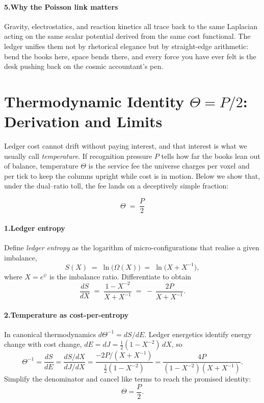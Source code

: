 \documentclass[11pt,oneside]{book}
\begin{document}
\paragraph*{5.\;Why the Poisson link matters}

Gravity, electrostatics, and reaction kinetics all trace back to the
same Laplacian acting on the same scalar potential derived from the same
cost functional.  
The ledger unifies them not by rhetorical elegance but by
straight-edge arithmetic: bend the books here, space bends there, and
every force you have ever felt is the desk pushing back on the cosmic
accountant’s pen.

\section{Thermodynamic Identity \texorpdfstring{$\Theta = P/2$}{Θ = P⁄2}: Derivation and Limits}
\label{sec:theta-p-half}

Ledger cost cannot drift without paying interest, and that interest is what we usually call \emph{temperature}.  
If recognition pressure $P$ tells how far the books lean out of balance, temperature $\Theta$ is the service fee the universe charges per voxel and per tick to keep the columns upright while cost is in motion.  
Below we show that, under the dual–ratio toll, the fee lands on a deceptively simple fraction:

\[
  \boxed{\;\Theta \;=\; \frac{P}{2}\;}
\]

\paragraph*{1.\;Ledger entropy}

Define \emph{ledger entropy} as the logarithm of micro-configurations that realise a given imbalance,
\[
  S(X) \;=\; \ln\!\bigl(\Omega(X)\bigr)
           \;=\; \ln\!\bigl(X + X^{-1}\bigr),
\]
where $X=e^{\psi}$ is the imbalance ratio.  
Differentiate to obtain
\[
  \frac{dS}{dX}
  \;=\;
  \frac{1 - X^{-2}}{X + X^{-1}}
  \;=\;
  -\,\frac{2P}{X + X^{-1}}.
\]

\paragraph*{2.\;Temperature as cost-per-entropy}

In canonical thermodynamics
\(d\Theta^{-1} = dS/dE\).  
Ledger energetics identify energy change with cost change,
$dE = dJ = \tfrac12(1 - X^{-2})\,dX$,  
so
\[
  \Theta^{-1}
  =
  \frac{dS}{dE}
  =
  \frac{dS/dX}{dJ/dX}
  =
  \frac{-2P/(X + X^{-1})}{\tfrac12(1 - X^{-2})}
  =
  \frac{4P}{(1 - X^{-2})(X + X^{-1})}.
\]
Simplify the denominator and cancel like terms to reach the promised identity:
\[
  \Theta
  =
  \frac{P}{2}.
\]
\end{document}
